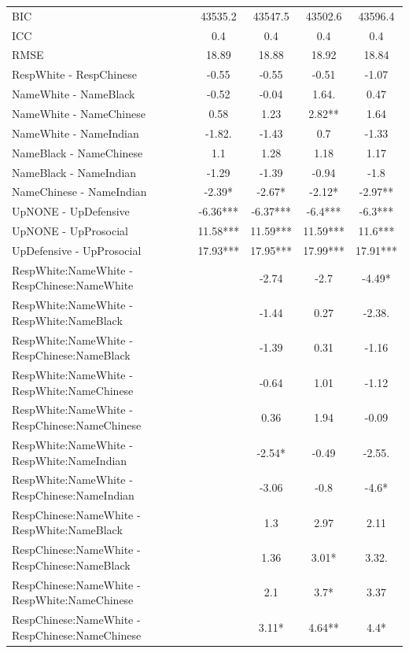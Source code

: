 \documentclass[]{report}
\begin{document}
\begin{table}
{\begin{tabular}[t]{lcccc}
BIC & \num{43535.2} & \num{43547.5} & \num{43502.6} & \num{43596.4}\\
ICC & \num{0.4} & \num{0.4} & \num{0.4} & \num{0.4}\\
RMSE & \num{18.89} & \num{18.88} & \num{18.92} & \num{18.84}\\
		  \hline
		RespWhite - RespChinese & -0.55 & -0.55 & -0.51 & -1.07 \\ 
		NameWhite - NameBlack & -0.52 & -0.04 & 1.64. & 0.47 \\ 
		NameWhite - NameChinese & 0.58 & 1.23 & 2.82** & 1.64 \\ 
		NameWhite - NameIndian & -1.82. & -1.43 & 0.7 & -1.33 \\ 
		NameBlack - NameChinese & 1.1 & 1.28 & 1.18 & 1.17 \\ 
		NameBlack - NameIndian & -1.29 & -1.39 & -0.94 & -1.8 \\ 
		NameChinese - NameIndian & -2.39* & -2.67* & -2.12* & -2.97** \\ 
		UpNONE - UpDefensive & -6.36*** & -6.37*** & -6.4*** & -6.3*** \\ 
		UpNONE - UpProsocial & 11.58*** & 11.59*** & 11.59*** & 11.6*** \\ 
		UpDefensive - UpProsocial & 17.93*** & 17.95*** & 17.99*** & 17.91*** \\ 
		RespWhite:NameWhite - RespChinese:NameWhite &  & -2.74 & -2.7 & -4.49* \\ 
		RespWhite:NameWhite - RespWhite:NameBlack &  & -1.44 & 0.27 & -2.38. \\ 
		RespWhite:NameWhite - RespChinese:NameBlack &  & -1.39 & 0.31 & -1.16 \\ 
		RespWhite:NameWhite - RespWhite:NameChinese &  & -0.64 & 1.01 & -1.12 \\ 
		RespWhite:NameWhite - RespChinese:NameChinese &  & 0.36 & 1.94 & -0.09 \\ 
		RespWhite:NameWhite - RespWhite:NameIndian &  & -2.54* & -0.49 & -2.55. \\ 
		RespWhite:NameWhite - RespChinese:NameIndian &  & -3.06 & -0.8 & -4.6* \\ 
		RespChinese:NameWhite - RespWhite:NameBlack &  & 1.3 & 2.97 & 2.11 \\ 
		RespChinese:NameWhite - RespChinese:NameBlack &  & 1.36 & 3.01* & 3.32. \\ 
		RespChinese:NameWhite - RespWhite:NameChinese &  & 2.1 & 3.7* & 3.37 \\ 
		RespChinese:NameWhite - RespChinese:NameChinese &  & 3.11* & 4.64** & 4.4* \\ 

\end{tabular}}
\end{table}
\end{document}

